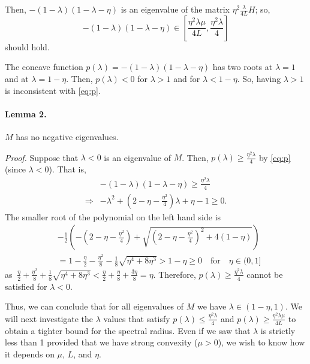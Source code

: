 \documentclass[11pt]{article}
\begin{document}
Then, $-(1-\lambda)(1-\lambda-\eta)$ is an eigenvalue of the matrix $\eta^2 \displaystyle\frac{\lambda}{4L}H$; so,
\begin{equation}
 -(1-\lambda)(1-\lambda-\eta) \in \left[\frac{\eta^2\lambda\mu}{4L},\frac{\eta^2\lambda}{4}\right]
 \label{eq:p}
\end{equation}
should hold.

The concave function $p(\lambda)= -(1-\lambda)(1-\lambda-\eta)$ has two roots at $\lambda=1$ and at $\lambda=1-\eta$.  Then, $p(\lambda)<0$ for $\lambda>1$ and for $\lambda<1-\eta$.  So, having $\lambda>1$ is inconsistent with \eqref{eq:p}.  

\bigskip

\paragraph{Lemma 2.}$M$ has no negative eigenvalues.  

\bigskip

\noindent
\textit{Proof.} Suppose that $\lambda<0$ is an eigenvalue of $M$.  Then, $p(\lambda)\geq \displaystyle\frac{\eta^2 \lambda}{4}$ by \eqref{eq:p}(since $\lambda<0$). That is,
\begin{align*}
 &-(1-\lambda)(1-\lambda-\eta) \geq \displaystyle\frac{\eta^2 \lambda}{4}\\
 \Rightarrow&-\lambda^2+(2-\eta-\displaystyle\frac{\eta^2}{4})\lambda+\eta-1\geq 0.  
\end{align*}
The smaller root of the polynomial on the left hand side is
\begin{align*}
 &-\frac{1}{2}\left(-(2-\eta-\displaystyle\frac{\eta^2}{4})+\sqrt{(2-\eta-\displaystyle\frac{\eta^2}{4})^2+4(1-\eta)}\right)\\
 &=1-\frac{\eta}{2}-\frac{\eta^2}{8}-\frac{1}{8}\sqrt{\eta^4+8\eta^3}>1-\eta\geq 0 \quad \mbox{for}\quad \eta\in(0,1]
\end{align*}
as $\ \displaystyle\frac{\eta}{2}+\frac{\eta^2}{8}+\frac{1}{8}\sqrt{\eta^4+8\eta^3}<\frac{\eta}{2}+\frac{\eta}{8}+\frac{3\eta}{8}=\eta$.
Therefore, $p(\lambda)\geq \displaystyle\frac{\eta^2 \lambda}{4}$ cannot be satisfied for $\lambda<0$.  

\bigskip

Thus, we can conclude that for all eigenvalues of $M$ we have $\lambda\in(1-\eta,1)$.  We will next investigate the $\lambda$ values that satisfy $p(\lambda)\leq \displaystyle\frac{\eta^2 \lambda}{4}$ and $p(\lambda)\geq \displaystyle\frac{\eta^2 \lambda\mu}{4L}$ to obtain a tighter bound for the spectral radius.  Even if we saw that $\lambda$ is strictly less than 1 provided that we have strong convexity ($\mu>0$), we wish to know how it depends on $\mu$, $L$, and $\eta$.
\end{document}
